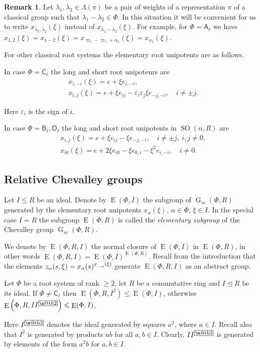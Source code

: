 \documentclass[12pt]{amsart}
\makeatletter
\numberwithin{equation}{section}
\theoremstyle{definition}
\newtheorem{rem}[equation]{Remark}
\DeclareMathOperator{\G}{G}
\DeclareMathOperator{\SO}{SO}
\DeclareMathOperator{\E}{E}
\newcommand{\rA}{\mathsf{A}}
\newcommand{\rB}{\mathsf{B}}
\newcommand{\rC}{\mathsf{C}}
\newcommand{\rD}{\mathsf{D}}
\newcommand{\indexbox}[1]{\text{\fboxsep=.1em\fbox{\m@th$\displaystyle#1$}}}
\def\ssub#1{\mathchoice
   {_{\lower2pt\hbox{$\scriptstyle #1$}}}
   {_{\lower2pt\hbox{$\scriptstyle #1$}}}
   {_{\lower1.5pt\hbox{$\scriptscriptstyle #1$}}}
   {_{\!\lower1.5pt\hbox{$\scriptscriptstyle #1$}}}}
\makeatother
\begin{document}
\begin{rem}
Let $\lambda_1, \lambda_2 \in \Lambda(\pi)$ be a pair of weights of a representation $\pi$ of a classical group such that $\lambda_1-\lambda_2\in \Phi$.
In this situation it will be convenient for us to write $x_{\lambda_1,\lambda_2}(\xi)$ instead of $x_{\lambda_1-\lambda_2}(\xi)$.
For example, for $\Phi=\rA_\ell$ we have $x_{1,2}(\xi)=x_{1-2}(\xi)=x_{\varpi_1 - \varpi_1 + \alpha_1}(\xi) = x_{\alpha_1}(\xi)$.
\end{rem}
For other classical root systems the elementary root unipotents are as follows.

In case $\Phi=\rC_\ell$ the long and short root unipotenrs are
\begin{align*}
& x_{i,-i}(\xi)=e+\xi e_{i,-i}, \\ 
& x_{i,j}(\xi)=e+\xi e_{ij}-\varepsilon_i\varepsilon_j\xi e_{-j,-i},\quad i\neq\pm j.
\end{align*}

Here $\varepsilon_i$ is the sign of $i$.

In case $\Phi=\rB_\ell,\rD_\ell$ the long and short root unipotents in $\SO(n,R)$ are
\begin{align*}
& x_{i,j}(\xi)=e+\xi e_{ij}-\xi e_{-j,-i},\quad i\neq\pm j,\ i,j\neq0, \\
& x_{i0}(\xi)=e+2\xi e_{i0}-\xi e_{0,i}-\xi^2 e_{i,-i},\quad i\neq0.
\end{align*}

\subsection{Relative Chevalley groups}\label{sec:relative-elementary}
Let $I\leq R$ be an ideal. Denote by $\E(\Phi, I)$ the subgroup of $\G_{sc}(\Phi, R)$ generated by the elementary root unipotents $x_\alpha(\xi)$, $\alpha\in\Phi$, $\xi\in I$.
In the special case $I=R$ the subgroup $\E(\Phi, R)$ is called the {\it elementary subgroup} of the Chevalley group $\G_{sc}(\Phi, R)$.

We denote by $\E(\Phi, R, I)$ the normal closure of $\E(\Phi, I)$ in $\E(\Phi, R)$, in other words $\E(\Phi, R, I) = \E(\Phi, I)^{\E(\Phi, R)}$.
Recall from the introduction that the elements $z_\alpha(s, \xi) = x_\alpha(s)^{x\ssub{-\alpha}(\xi)}$ generate $\E(\Phi, R, I)$ as an abstract group.

\begin{lemma}[{\cite[Corollary~3.3]{S}}]\label{lemma:Stepanov-ideal}
Let $\Phi$ be a root system of rank $\geqslant2$, let $R$ be a commutative ring and $I\trianglelefteq R$ be its ideal.
If $\Phi\neq\rC_\ell$ then $\E\left(\Phi,R,I^2\right)\leqslant\E(\Phi,I)$, otherwise $\E\left(\Phi,R,II^{\indexbox{2}}\right)\leqslant\E(\Phi,I)$.
\end{lemma}
Here $I^{\indexbox{2}}$ denotes the ideal generated by squares $a^2$, where $a\in I$.
Recall also that $I^2$ is generated by products $ab$ for all $a,b\in I$.
Clearly, $II^{\indexbox{2}}$ is generated by elements of the form $a^2b$ for $a,b\in I$.
\end{document}
